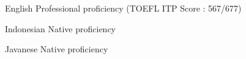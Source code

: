 
\begin{cvskills}

  \cvskill
    {English} %
    {Professional proficiency (TOEFL ITP Score : 567/677)} %

  \cvskill
    {Indonesian} %
    {Native proficiency} %

  \cvskill
    {Javanese} %
    {Native proficiency} %
    
\end{cvskills}
